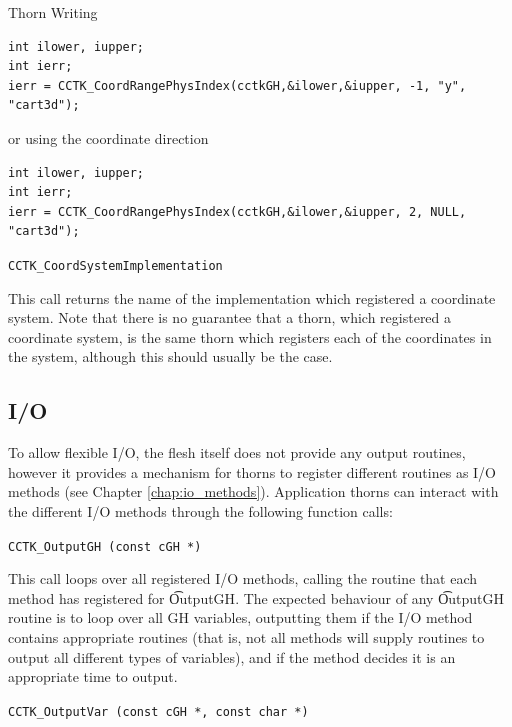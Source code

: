 \begin{cactuspart}{Thorn Writing}
\begin{Lentry}
\begin{verbatim}
int ilower, iupper;
int ierr;
ierr = CCTK_CoordRangePhysIndex(cctkGH,&ilower,&iupper, -1, "y", "cart3d");
\end{verbatim}
or using the coordinate direction
\begin{verbatim}
int ilower, iupper;
int ierr;
ierr = CCTK_CoordRangePhysIndex(cctkGH,&ilower,&iupper, 2, NULL, "cart3d");
\end{verbatim}

\item[\texttt{CCTK\_CoordSystemImplementation}]

This call returns the name of the implementation which registered a coordinate system.
Note that there is no guarantee that a thorn, which registered a coordinate system, is
the same thorn which registers each of the coordinates in the system, although this
should usually be the case.

\end{Lentry}


\subsection{I/O}
\label{sec:io}

To allow flexible I/O, the flesh itself does not provide any output
routines, however it provides a mechanism for thorns to register
different routines as I/O methods (see Chapter \ref{chap:io_methods}).
Application thorns can interact with the different I/O methods through
the following function calls:

\begin{description}

\item \texttt{CCTK\_OutputGH (const cGH *)}

This call loops over all registered I/O methods, calling the routine
that each method has registered for {\t OutputGH}.  The expected
behaviour of any {\t OutputGH} routine is to loop over all GH
variables, outputting them if the I/O method contains appropriate
routines (that is, not all methods will supply routines to output all
different types of variables), and if the method decides it is an
appropriate time to output.

\item \texttt{CCTK\_OutputVar (const cGH *, const char *)}


\end{description}
\end{cactuspart}
